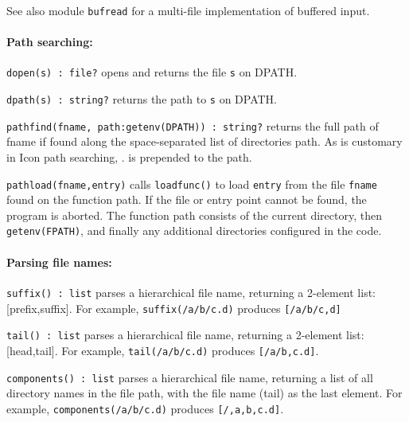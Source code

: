 See also module \texttt{bufread} for a multi-file implementation of
buffered input.

\paragraph{Path searching:}
\texttt{dopen(s) : file?} opens and returns the file \texttt{s} on
DPATH.

\texttt{dpath(s) : string?} returns the path to \texttt{s} on DPATH.

\texttt{pathfind(fname,
path:getenv({\textquotedbl}DPATH{\textquotedbl})) : string?} returns
the full path of fname if found along the space-separated list of
directories {\textquotedbl}path{\textquotedbl}. As is customary in Icon
path searching, {\textquotedbl}.{\textquotedbl} is prepended to the
path.

\texttt{pathload(fname,entry)} calls \texttt{loadfunc()} to load
\texttt{entry} from the file \texttt{fname} found on the function path.
If the file or entry point cannot be found, the program is aborted. The
function path consists of the current directory, then
\texttt{getenv({\textquotedbl}FPATH{\textquotedbl})}, and finally any
additional directories configured in the code.

\paragraph[Parsing file names:]{Parsing file names:}
\texttt{suffix() : list} parses a hierarchical file name, returning a
2-element list: [prefix,suffix]. For example,
\texttt{suffix({\textquotedbl}/a/b/c.d{\textquotedbl})} produces
\texttt{[{\textquotedbl}/a/b/c{\textquotedbl},{\textquotedbl}d{\textquotedbl}]}

\texttt{tail() : list} parses a hierarchical file name, returning a
2-element list: [head,tail]. For example,
\texttt{tail({\textquotedbl}/a/b/c.d{\textquotedbl})} produces
\texttt{[{\textquotedbl}/a/b{\textquotedbl},{\textquotedbl}c.d{\textquotedbl}]}.

\texttt{components() : list} parses a hierarchical file name, returning
a list of all directory names in the file path, with the file name
(tail) as the last element. For example,
\texttt{components({\textquotedbl}/a/b/c.d{\textquotedbl})} produces
\texttt{[{\textquotedbl}/{\textquotedbl},{\textquotedbl}a{\textquotedbl},{\textquotedbl}b{\textquotedbl},{\textquotedbl}c.d{\textquotedbl}]}.

